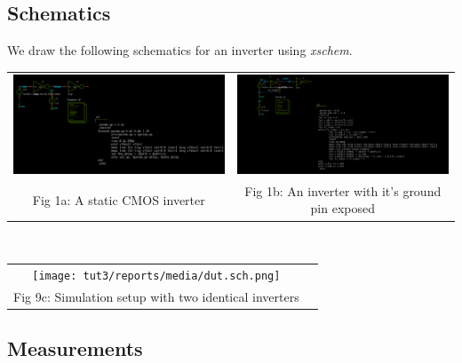 \documentclass[12pt,a4paper]{article}
\begin{document}
\subsection{Schematics}
\noindent We draw the following schematics for an inverter using \emph{xschem}.
\begin{center}
\begin{tabular}{cc}
     \includegraphics[width=0.49\linewidth]{tut3/reports/media/expt1_a.sch.png} &
     \includegraphics[width=0.49\linewidth]{tut3/reports/media/expt1_b.sch.png} \\
     Fig 1a: A static CMOS inverter & Fig 1b: An inverter with it's ground pin exposed
\end{tabular}
\\
\begin{tabular}{cc}
     \texttt{[image: tut3/reports/media/dut.sch.png]} &
     \\ Fig 9c: Simulation setup with two identical inverters
\end{tabular}
\end{center}
\subsection{Measurements}

\end{document}
